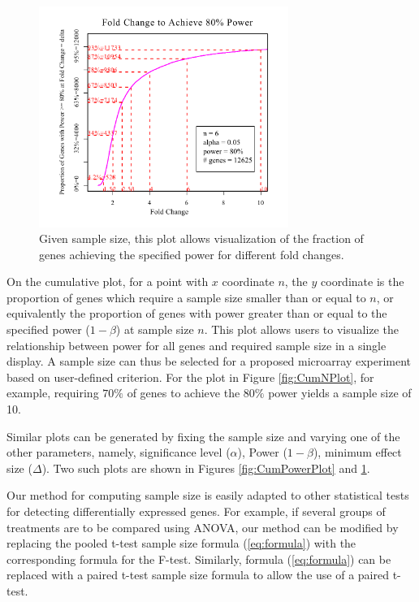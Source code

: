\documentclass{bioinfo}
\begin{document}
\begin{figure}[h]
  \centerline{\includegraphics*[width=3.2in]{CumFoldChangePlotP.pdf}}
  \caption[Given Sample Size, Fold Change (Effect Size) Necessary to
    Achieving a Specified Power]{Given sample size, this plot allows
    visualization of the fraction of genes achieving the specified
    power for different fold changes.}
  \label{fig:CumFoldChangePlot}
\end{figure}

On the cumulative plot, for a point with $x$ coordinate $n$, the
$y$ coordinate is the proportion of genes which require a sample
size smaller than or equal to $n$, or equivalently the proportion
of genes with power greater than or equal to the specified power
($1-\beta$) at sample size $n$. This plot allows users to
visualize the relationship between power for all genes and
required sample size in a single display.  A sample size can thus
be selected for a proposed microarray experiment based on
user-defined criterion. For the plot in Figure \ref{fig:CumNPlot},
for example, requiring $70\%$ of genes to achieve the $80\%$ power
yields a sample size of 10.

Similar plots can be generated by fixing the sample size and
varying one of the other parameters, namely, significance level
($\alpha$), Power ($1-\beta$), minimum effect size ($\Delta$). Two
such plots are shown in Figures \ref{fig:CumPowerPlot} and
\ref{fig:CumFoldChangePlot}.

Our method for computing sample size is easily adapted to other
statistical tests for detecting differentially expressed genes. For
example, if several groups of treatments are to be compared using
ANOVA, our method can be modified by replacing the pooled t-test
sample size formula (\ref{eq:formula}) with the corresponding
formula for the F-test. Similarly, formula (\ref{eq:formula}) can be
replaced with a paired t-test sample size formula to allow the use
of a paired t-test.
\end{document}
